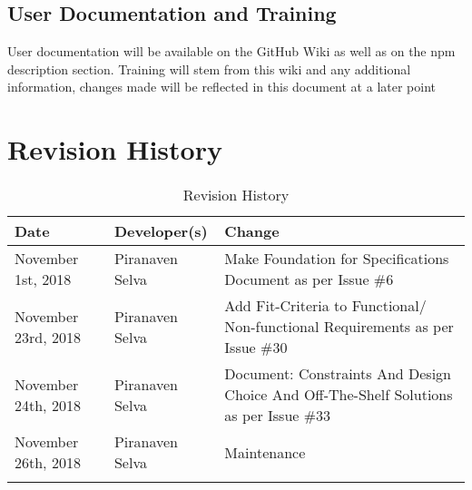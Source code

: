 \documentclass{article}
\begin{document}
\subsection{User Documentation and Training}

User documentation will be available on the GitHub Wiki as well as on the npm description section. 
\newline
Training will stem from this wiki and any additional information, changes made will be reflected in this document at a later point


\newpage
\section{Revision History}
\begin{table}[hp]
\caption{Revision History} \label{TblRevisionHistory}
\begin{tabularx}{\textwidth}{llX}
\toprule
\textbf{Date} & \textbf{Developer(s)} & \textbf{Change}\\
\midrule
November 1st, 2018 & Piranaven Selva & Make Foundation for Specifications Document as per Issue \#6 \\
November 23rd, 2018 & Piranaven Selva & Add Fit-Criteria to Functional/ Non-functional Requirements as per Issue \#30 \\
November 24th, 2018 & Piranaven Selva & Document: Constraints And Design Choice And Off-The-Shelf Solutions as per Issue \#33 \\
November 26th, 2018 & Piranaven Selva & Maintenance  \\
\\
\bottomrule
\end{tabularx}
\end{table}
\end{document}
